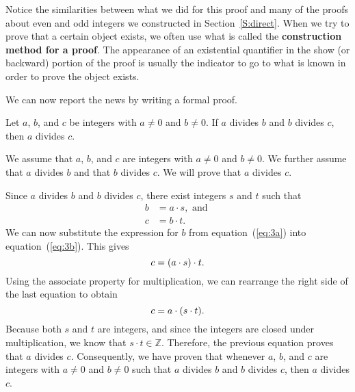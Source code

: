 \newpar
Notice the similarities between what we did for this proof and many of the proofs about even and odd integers we constructed in Section~\ref{S:direct}.  When we try to prove that a certain object exists, we often use what is called the  \textbf{construction method for a proof}.
%
  The appearance of an existential quantifier in the show (or backward) portion of the proof is usually the indicator to go to what is known in order to prove the object exists.

\newpar
We can now report the news by writing a formal proof.
%
\setcounter{equation}{0}
\begin{theorem}\label{T:transdivide}
Let  $a$, $b$, and  $c$  be integers with $a \ne 0$ and $b \ne 0$.  If  $a$  divides  $b$  and  $b$  divides  $c$, then  $a$  divides  $c$.
\end{theorem}
%
\begin{myproof}
We assume that $a$, $b$, and  $c$  are integers with $a \ne 0$ and $b \ne 0$.  We further assume that  $a$  divides  $b$  and that  $b$  divides  $c$.  We  will prove that  $a$  divides  $c$.

Since  $a$  divides  $b$ and $b$ divides $c$, there exist integers  $s$ and $t$  such that
\begin{align}\label{eq:3a}
b &= a \cdot s, \text{ and } \\
c &= b \cdot t.\label{eq:3b}
\end{align}
We can now substitute the expression for  $b$  from equation~(\ref{eq:3a}) into equation~(\ref{eq:3b}).  This gives
\begin{equation}\label{eq:3c} \notag
c = ( {a \cdot s}) \cdot t.
\end{equation}
Using the associate property for multiplication, we can rearrange the right side of the last equation to obtain
\begin{equation}\label{eq:3d} \notag
c = a \cdot ( {s \cdot t} ).
\end{equation}
Because both  $s$  and  $t$  are integers, and since the integers are closed under multiplication, we know that  $s \cdot t \in \mathbb{Z}$.  Therefore, the previous equation 
proves that  $a$  divides  $c$.  Consequently, we have proven that whenever  $a$, $b$, and  $c$  are integers with $a \ne 0$ and $b \ne 0$ such that  $a$  divides  $b$ and  $b$ divides  $c$, then  $a$  divides  $c$.
\end{myproof}
\hbreak

\endinput
